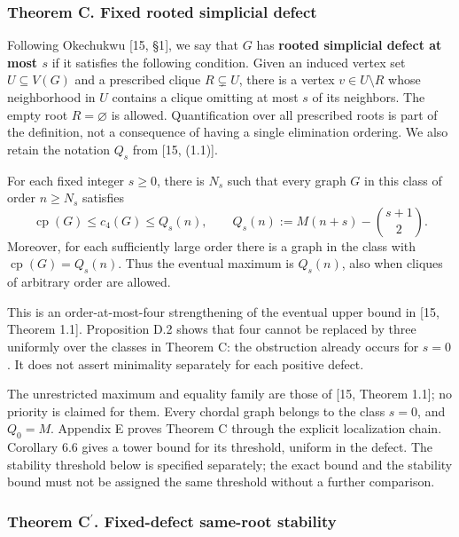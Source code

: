 \documentclass[english,11pt,a4paper]{article}
\begin{document}
\subsubsection{Theorem C. Fixed rooted simplicial defect}\label{theorem-c.-fixed-rooted-simplicial-defect}

Following Okechukwu {[}15, §1{]}, we say that \(G\) has \textbf{rooted simplicial defect at most \(s\)} if it satisfies the following condition. Given an induced vertex set \(U\subseteq V(G)\) and a prescribed clique \(R\subsetneq U\), there is a vertex \(v\in U\setminus R\) whose neighborhood in \(U\) contains a clique omitting at most \(s\) of its neighbors. The empty root \(R=\varnothing\) is allowed. Quantification over all prescribed roots is part of the definition, not a consequence of having a single elimination ordering. We also retain the notation \(Q_s\) from {[}15, (1.1){]}.

For each fixed integer \(s\ge0\), there is \(N_s\) such that every graph \(G\) in this class of order \(n\ge N_s\) satisfies \[
\operatorname{cp}(G)\le c_4(G)\le Q_s(n),
\qquad
Q_s(n):=M(n+s)-\binom{s+1}{2}.
\tag{C}
\] Moreover, for each sufficiently large order there is a graph in the class with \(\operatorname{cp}(G)=Q_s(n)\). Thus the eventual maximum is \(Q_s(n)\), also when cliques of arbitrary order are allowed.

This is an order-at-most-four strengthening of the eventual upper bound in {[}15, Theorem 1.1{]}. Proposition D.2 shows that four cannot be replaced by three uniformly over the classes in Theorem C: the obstruction already occurs for \(s=0\). It does not assert minimality separately for each positive defect.

The unrestricted maximum and equality family are those of {[}15, Theorem 1.1{]}; no priority is claimed for them. Every chordal graph belongs to the class \(s=0\), and \(Q_0=M\). Appendix E proves Theorem C through the explicit localization chain. Corollary 6.6 gives a tower bound for its threshold, uniform in the defect. The stability threshold below is specified separately; the exact bound and the stability bound must not be assigned the same threshold without a further comparison.

\subsubsection{Theorem \texorpdfstring{C\ensuremath{^{\prime}}}{C'}. Fixed-defect same-root stability}\label{theorem-c.-fixed-defect-same-root-stability}
\end{document}
